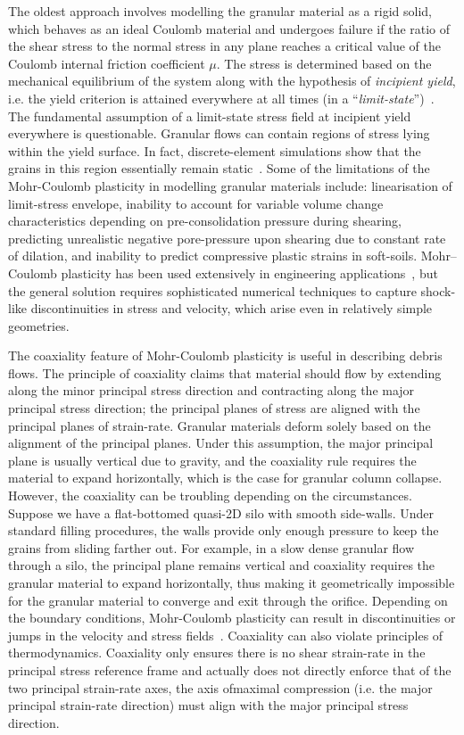 The oldest approach involves modelling the granular material as a rigid solid, 
which behaves as an ideal Coulomb material and undergoes failure if the ratio 
of the shear stress to the normal stress in any plane reaches a critical value 
of the Coulomb internal friction coefficient $\mu$. The stress is determined 
based on the mechanical equilibrium of the system along with the hypothesis of 
\textit{incipient yield}, i.e. the yield criterion is attained everywhere at 
all times (in a ``\textit{limit-state}'')~\citep{Rycroft2009b}. The fundamental 
assumption of a limit-state stress field at incipient yield everywhere is 
questionable. Granular flows can contain regions of stress lying within the 
yield surface. In fact, discrete-element simulations show that the grains in 
this region essentially remain static~\citep{Staron2005}. Some of the 
limitations of the Mohr-Coulomb plasticity in modelling granular materials 
include: linearisation of limit-stress envelope, inability to account for 
variable volume change characteristics depending on pre-consolidation pressure 
during shearing, predicting unrealistic negative pore-pressure upon shearing 
due to constant rate of dilation, and inability to predict compressive plastic 
strains in soft-soils. Mohr–Coulomb plasticity has been used 
extensively in engineering applications~\citep{Nedderman1992}, but the general 
solution requires sophisticated numerical techniques to capture shock-like 
discontinuities in stress and velocity, which arise even in relatively simple 
geometries. 

The coaxiality feature of Mohr-Coulomb plasticity 
is useful in describing debris flows. The principle of coaxiality
claims that material should flow by extending along the
minor principal stress direction and contracting along the major principal 
stress direction; the principal planes of stress are aligned with the principal 
planes of strain-rate. Granular materials deform solely based 
on the alignment of the principal planes. Under this assumption, the major 
principal plane is usually vertical due to gravity, and the coaxiality rule 
requires the material to expand horizontally, which is the case for granular 
column collapse. However, the coaxiality can be troubling depending on the 
circumstances. Suppose we have a flat-bottomed quasi-2D silo with smooth 
side-walls. Under standard filling procedures, the walls provide only enough 
pressure to keep the grains from sliding farther out.  For example, in a slow 
dense granular flow through a silo, the principal plane remains vertical and 
coaxiality requires the granular material to expand horizontally, thus 
making it geometrically impossible for the granular material to converge and 
exit through the orifice. Depending on the boundary conditions, Mohr-Coulomb 
plasticity can result in discontinuities or jumps in the velocity and stress 
fields~\citep{Rycroft2006}. Coaxiality can also violate principles of 
thermodynamics. Coaxiality only ensures there is no shear strain-rate in the 
principal stress reference frame and actually does not directly enforce that of 
the two principal strain-rate axes, the axis ofmaximal compression (i.e. the 
major principal strain-rate direction) must align with the major principal 
stress direction.

